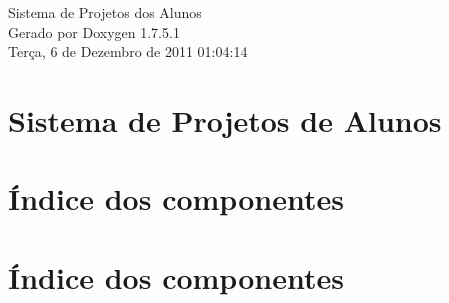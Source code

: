 \documentclass[a4paper]{book}
\begin{document}
\hypersetup{pageanchor=false,citecolor=blue}
\begin{titlepage}
\vspace*{7cm}
\begin{center}
{\Large \-Sistema de \-Projetos dos \-Alunos }\\
\vspace*{1cm}
{\large \-Gerado por Doxygen 1.7.5.1}\\
\vspace*{0.5cm}
{\small Terça, 6 de Dezembro de 2011 01:04:14}\\
\end{center}
\end{titlepage}
\clearemptydoublepage
{}
\tableofcontents
\clearemptydoublepage
{}
\hypersetup{pageanchor=true,citecolor=blue}
\chapter{\-Sistema de \-Projetos de \-Alunos}
\label{index}\hypertarget{index}{}
\chapter{Índice dos componentes}

\chapter{Índice dos componentes}

\end{document}
